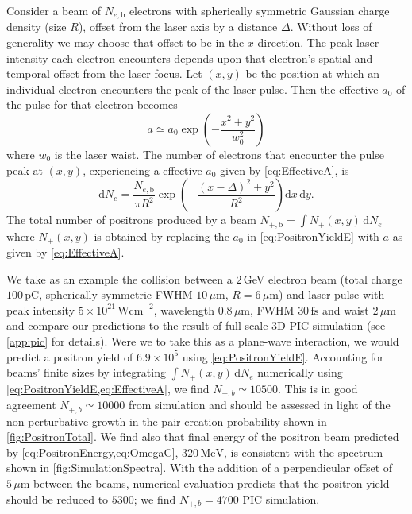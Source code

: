 \documentclass[reprint,superscriptaddress,amsmath,amssymb,aps,pra]{revtex4-1}
\newcommand{\micron}{{\mu\mathrm{m}}}
\newcommand{\Wcm}{\mathrm{Wcm}}
\newcommand{\rmd}{\mathrm{d}}
\newcommand{\fs}{\mathrm{fs}}
\newcommand{\MeV}{\mathrm{MeV}}
\begin{document}
Consider a beam of $N_{e,\mathrm{b}}$ electrons with spherically symmetric Gaussian
charge density (size $R$), offset from the laser axis by a distance $\Delta$.
Without loss of generality we may choose that offset to be in the $x$-direction.
The peak laser intensity each electron encounters depends upon
that electron's spatial and temporal offset from the laser focus. Let $(x,y)$ 
be the position at which an individual electron encounters the peak of the
laser pulse. Then the effective $a_0$ of the pulse for that electron becomes
	\begin{equation}
	a \simeq a_0
		\exp\!\left( -\frac{x^2 + y^2}{w_0^2} \right)
	\label{eq:EffectiveA}
	\end{equation}
where $w_0$ is the laser waist.
The number of electrons that encounter the pulse peak at $(x,y)$, experiencing
a effective $a_0$ given by \cref{eq:EffectiveA}, is
	\begin{equation}
	\rmd N_e =
		\frac{N_{e,\mathrm{b}}}{\pi R^2}
		\exp\!\left( -\frac{(x - \Delta)^2 + y^2}{R^2} \right)
		\rmd x\,\rmd y.
	\end{equation}
The total number of positrons produced by a beam $N_{+,\mathrm{b}} = \int\!N_+(x,y)\,\rmd N_e$
where $N_+(x,y)$ is obtained by replacing the $a_0$ in \cref{eq:PositronYieldE}
with $a$ as given by \cref{eq:EffectiveA}.

We take as an example the collision between a $2\,$GeV electron beam
(total charge $100\,$pC, spherically symmetric FWHM $10\,\micron$, $R = 6\,\micron$) and
laser pulse with peak intensity $5\times10^{21}\,\Wcm^{-2}$, wavelength
$0.8\,\micron$, FWHM $30\,\fs$ and waist $2\,\micron$ and
compare our predictions to the result of full-scale 3D PIC simulation (see
\cref{app:pic} for details).
Were we to take this as a plane-wave interaction, we would predict a positron yield
of $6.9\times10^{5}$ using \cref{eq:PositronYieldE}.
Accounting for beams' finite sizes by integrating $\int\!N_+(x,y)\,\rmd N_e$
numerically using \cref{eq:PositronYieldE,eq:EffectiveA}, we find $N_{+,b} \simeq 10500$.
This is in good agreement $N_{+,b} \simeq 10000$ from simulation and should be
assessed in light of the non-perturbative growth in the pair
creation probability shown in \cref{fig:PositronTotal}.
We find also that final energy of the positron beam predicted by
\cref{eq:PositronEnergy,eq:OmegaC}, $320\,\MeV$, is consistent with
the spectrum shown in \cref{fig:SimulationSpectra}.
With the addition of a perpendicular offset of $5\,\micron$ between the beams,
numerical evaluation predicts that the positron yield should be reduced to
$5300$; we find $N_{+,b} = 4700$ PIC simulation.
\end{document}
